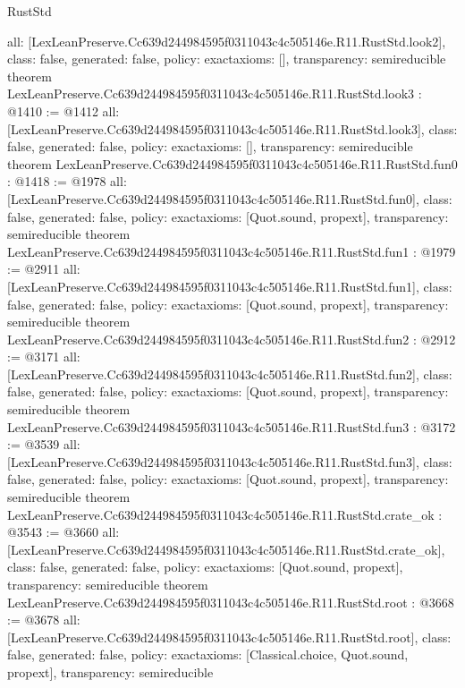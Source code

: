 \begin{lexlean}{RustStd}
\begin{coremodule}
{  all: [LexLeanPreserve.Cc639d244984595f0311043c4c505146e.R11.RustStd.look2],
  class: false,
  generated: false,
  policy: exact{axioms: []},
  transparency: semireducible
}
theorem LexLeanPreserve.Cc639d244984595f0311043c4c505146e.R11.RustStd.look3 : @1410 := @1412 {
  all: [LexLeanPreserve.Cc639d244984595f0311043c4c505146e.R11.RustStd.look3],
  class: false,
  generated: false,
  policy: exact{axioms: []},
  transparency: semireducible
}
theorem LexLeanPreserve.Cc639d244984595f0311043c4c505146e.R11.RustStd.fun0 : @1418 := @1978 {
  all: [LexLeanPreserve.Cc639d244984595f0311043c4c505146e.R11.RustStd.fun0],
  class: false,
  generated: false,
  policy: exact{axioms: [Quot.sound, propext]},
  transparency: semireducible
}
theorem LexLeanPreserve.Cc639d244984595f0311043c4c505146e.R11.RustStd.fun1 : @1979 := @2911 {
  all: [LexLeanPreserve.Cc639d244984595f0311043c4c505146e.R11.RustStd.fun1],
  class: false,
  generated: false,
  policy: exact{axioms: [Quot.sound, propext]},
  transparency: semireducible
}
theorem LexLeanPreserve.Cc639d244984595f0311043c4c505146e.R11.RustStd.fun2 : @2912 := @3171 {
  all: [LexLeanPreserve.Cc639d244984595f0311043c4c505146e.R11.RustStd.fun2],
  class: false,
  generated: false,
  policy: exact{axioms: [Quot.sound, propext]},
  transparency: semireducible
}
theorem LexLeanPreserve.Cc639d244984595f0311043c4c505146e.R11.RustStd.fun3 : @3172 := @3539 {
  all: [LexLeanPreserve.Cc639d244984595f0311043c4c505146e.R11.RustStd.fun3],
  class: false,
  generated: false,
  policy: exact{axioms: [Quot.sound, propext]},
  transparency: semireducible
}
theorem LexLeanPreserve.Cc639d244984595f0311043c4c505146e.R11.RustStd.crate_ok : @3543 := @3660 {
  all: [LexLeanPreserve.Cc639d244984595f0311043c4c505146e.R11.RustStd.crate_ok],
  class: false,
  generated: false,
  policy: exact{axioms: [Quot.sound, propext]},
  transparency: semireducible
}
theorem LexLeanPreserve.Cc639d244984595f0311043c4c505146e.R11.RustStd.root : @3668 := @3678 {
  all: [LexLeanPreserve.Cc639d244984595f0311043c4c505146e.R11.RustStd.root],
  class: false,
  generated: false,
  policy: exact{axioms: [Classical.choice, Quot.sound, propext]},
  transparency: semireducible
}


\end{coremodule}
\end{lexlean}
